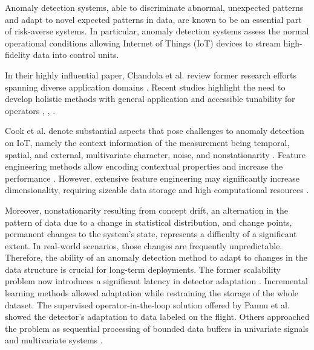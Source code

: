 Anomaly detection systems, able to discriminate abnormal, unexpected patterns and adapt to novel expected patterns in data, are known to be an essential part of risk-averse systems. In particular, anomaly detection systems assess the normal operational conditions allowing Internet of Things (IoT) devices to stream high-fidelity data into control units.

In their highly influential paper, Chandola et al. review former research efforts spanning diverse application domains \cite{Chandola2009}.
Recent studies highlight the need to develop holistic methods with general application and accessible tunability for operators \cite{Laptev2015}, \cite{Kejariwal2015}, \cite{Cook2020}.

Cook et al. denote substantial aspects that pose challenges to anomaly detection on IoT, namely the context information of the measurement being temporal, spatial, and external, multivariate character, noise, and nonstationarity \cite{Cook2020}. Feature engineering methods allow encoding contextual properties and increase the performance \cite{Fan2019}. However, extensive feature engineering may significantly increase dimensionality, requiring sizeable data storage and high computational resources \cite{Talagala2021}.

Moreover, nonstationarity resulting from concept drift, an alternation in the pattern of data due to a change in statistical distribution, and change points, permanent changes to the system's state, represents a difficulty of a significant extent. In real-world scenarios, those changes are frequently unpredictable. Therefore, the ability of an anomaly detection method to adapt to changes in the data structure is crucial for long-term deployments. The former scalability problem now introduces a significant latency in detector adaptation \cite{Wu2021}. Incremental learning methods allowed adaptation while restraining the storage of the whole dataset. The supervised operator-in-the-loop solution offered by Pannu et al. showed the detector's adaptation to data labeled on the flight.
Others approached the problem as sequential processing of bounded data buffers in univariate signals \cite{Ahmad2017134} and multivariate systems \cite{Bosman201514}.

